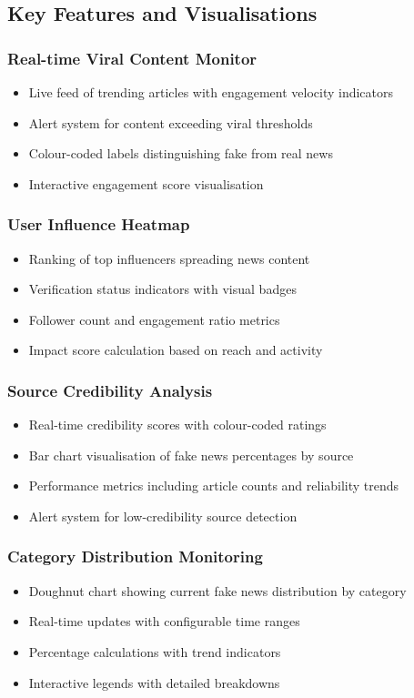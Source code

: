 \documentclass[12pt,a4paper]{article}
\begin{document}
\subsection{Key Features and Visualisations}

\subsubsection{Real-time Viral Content Monitor}
\begin{itemize}
    \item Live feed of trending articles with engagement velocity indicators
    \item Alert system for content exceeding viral thresholds
    \item Colour-coded labels distinguishing fake from real news
    \item Interactive engagement score visualisation
\end{itemize}

\subsubsection{User Influence Heatmap}
\begin{itemize}
    \item Ranking of top influencers spreading news content
    \item Verification status indicators with visual badges
    \item Follower count and engagement ratio metrics
    \item Impact score calculation based on reach and activity
\end{itemize}

\subsubsection{Source Credibility Analysis}
\begin{itemize}
    \item Real-time credibility scores with colour-coded ratings
    \item Bar chart visualisation of fake news percentages by source
    \item Performance metrics including article counts and reliability trends
    \item Alert system for low-credibility source detection
\end{itemize}

\subsubsection{Category Distribution Monitoring}
\begin{itemize}
    \item Doughnut chart showing current fake news distribution by category
    \item Real-time updates with configurable time ranges
    \item Percentage calculations with trend indicators
    \item Interactive legends with detailed breakdowns
\end{itemize}
\end{document}
